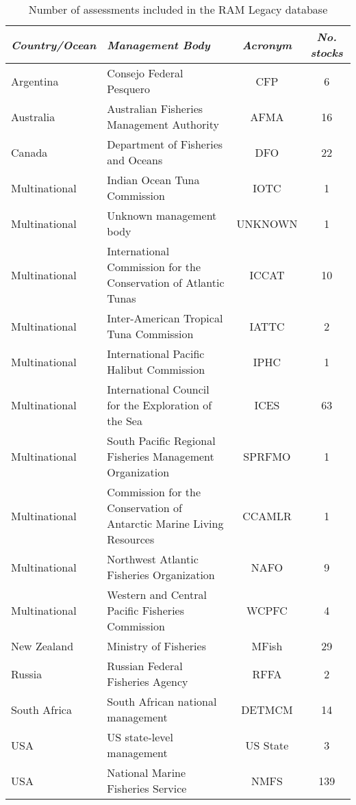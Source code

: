 \begin{table}[ht]
\begin{center}
\caption{Number of assessments included in the RAM Legacy database}
\label{tab:mgmt}
\begin{tabular}{p{3cm}p{5cm}cc}
\textit{Country/Ocean} & \textit{Management Body} & \textit{Acronym} & \textit{No. stocks} \\ \midrule
Argentina & Consejo Federal Pesquero & CFP &   6 \\ 
  Australia & Australian Fisheries Management Authority & AFMA &  16 \\ 
  Canada & Department of Fisheries and Oceans & DFO &  22 \\ 
  Multinational & Indian Ocean Tuna Commission & IOTC &   1 \\ 
  Multinational & Unknown management body & UNKNOWN &   1 \\ 
  Multinational & International Commission for the Conservation of Atlantic Tunas & ICCAT &  10 \\ 
  Multinational & Inter-American Tropical Tuna Commission & IATTC &   2 \\ 
  Multinational & International Pacific Halibut Commission & IPHC &   1 \\ 
  Multinational & International Council for the Exploration of the Sea & ICES &  63 \\ 
  Multinational & South Pacific Regional Fisheries Management Organization & SPRFMO &   1 \\ 
  Multinational & Commission for the Conservation of Antarctic Marine Living Resources & CCAMLR &   1 \\ 
  Multinational & Northwest Atlantic Fisheries Organization & NAFO &   9 \\ 
  Multinational & Western and Central Pacific Fisheries Commission & WCPFC &   4 \\ 
  New Zealand & Ministry of Fisheries & MFish &  29 \\ 
  Russia & Russian Federal Fisheries Agency & RFFA &   2 \\ 
  South Africa & South African national management & DETMCM &  14 \\ 
  USA & US state-level management & US State &   3 \\ 
  USA & National Marine Fisheries Service & NMFS & 139 \\ 
   \hline
\end{tabular}
\end{center}
\end{table}
